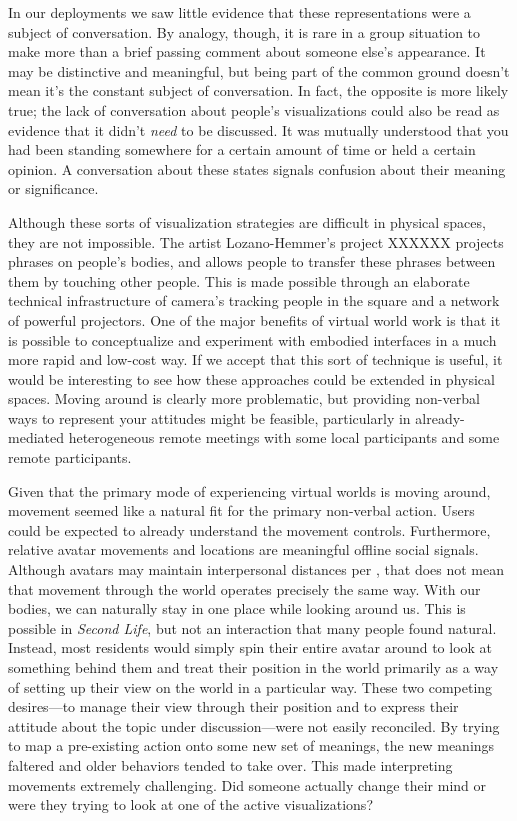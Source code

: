 In our deployments we saw little evidence that these representations were a subject of conversation. By analogy, though, it is rare in a group situation to make more than a brief passing comment about someone else's appearance. It may be distinctive and meaningful, but being part of the common ground doesn't mean it's the constant subject of conversation. In fact, the opposite is more likely true; the lack of conversation about people's visualizations could also be read as evidence that it didn't \emph{need} to be discussed. It was mutually understood that you had been standing somewhere for a certain amount of time or held a certain opinion. A conversation about these states signals confusion about their meaning or significance.

Although these sorts of visualization strategies are difficult in physical spaces, they are not impossible. The artist Lozano-Hemmer's project XXXXXX projects phrases on people's bodies, and allows people to transfer these phrases between them by touching other people. This is made possible through an elaborate technical infrastructure of camera's tracking people in the square and a network of powerful projectors. One of the major benefits of virtual world work is that it is possible to conceptualize and experiment with embodied interfaces in a much more rapid and low-cost way. If we accept that this sort of technique is useful, it would be interesting to see how these approaches could be extended in physical spaces. Moving around is clearly more problematic, but providing non-verbal ways to represent your attitudes might be feasible, particularly in already-mediated heterogeneous remote meetings with some local participants and some remote participants.

Given that the primary mode of experiencing virtual worlds is moving around, movement seemed like a natural fit for the primary non-verbal action. Users could be expected to already understand the movement controls. Furthermore, relative avatar movements and locations are meaningful offline social signals.  Although avatars may maintain interpersonal distances per \citep{Yee:2007cl}, that does not mean that movement through the world operates precisely the same way. With our bodies, we can naturally stay in one place while looking around us. This is possible in \emph{Second Life}, but not an interaction that many people found natural. Instead, most residents would simply spin their entire avatar around to look at something behind them and treat their position in the world primarily as a way of setting up their view on the world in a particular way. These two competing desires---to manage their view through their position and to express their attitude about the topic under discussion---were not easily reconciled. By trying to map a pre-existing action onto some new set of meanings, the new meanings faltered and older behaviors tended to take over. This made interpreting movements extremely challenging. Did someone actually change their mind or were they trying to look at one of the active visualizations?

